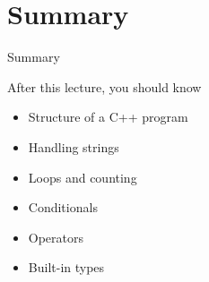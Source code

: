 \documentclass[\classoption]{beamer}
\begin{document}
\section{Summary}

\begin{frame}{Summary}
\begin{block}{After this lecture, you should know}
\begin{itemize}
\item Structure of a C++ program
\item Handling strings
\item Loops and counting
\item Conditionals
\item Operators
\item Built-in types
\end{itemize}

\end{block}


\end{frame}
\end{document}
